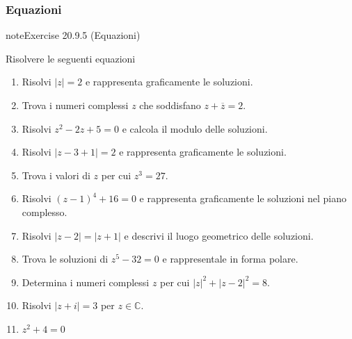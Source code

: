 \documentclass[letterpaper,10pt,italian]{jupyterBook}
\begin{document}
\subsubsection{Equazioni}
\label{\detokenize{ch/algebra/complex-algebra-problems:equazioni}}\label{\detokenize{ch/algebra/complex-algebra-problems:math-hs-algebra-complex-problems-equations-eq}} \label{exercise:ch/algebra/complex-algebra-problems-exercise-4}

\begin{sphinxadmonition}{note}{Exercise 20.9.5 (Equazioni)}



\sphinxAtStartPar
Risolvere le seguenti equazioni
\begin{enumerate}
%
\item {} 
\sphinxAtStartPar
Risolvi \(|z| = 2\) e rappresenta graficamente le soluzioni.

\item {} 
\sphinxAtStartPar
Trova i numeri complessi \(z\) che soddisfano \(z + \overline{z} = 2\).

\item {} 
\sphinxAtStartPar
Risolvi \(z^2 - 2z + 5 = 0\) e calcola il modulo delle soluzioni.

\item {} 
\sphinxAtStartPar
Risolvi \(|z - 3 + 1| = 2\) e rappresenta graficamente le soluzioni.

\item {} 
\sphinxAtStartPar
Trova i valori di \(z\) per cui \(z^3 = 27\).

\item {} 
\sphinxAtStartPar
Risolvi \((z-1)^4 + 16 = 0\) e rappresenta graficamente le soluzioni nel piano complesso.

\item {} 
\sphinxAtStartPar
Risolvi \(|z - 2| = |z + 1|\) e descrivi il luogo geometrico delle soluzioni.

\item {} 
\sphinxAtStartPar
Trova le soluzioni di \(z^5 - 32 = 0\) e rappresentale in forma polare.

\item {} 
\sphinxAtStartPar
Determina i numeri complessi \(z\) per cui \(|z|^2 + |z - 2|^2 = 8\).

\item {} 
\sphinxAtStartPar
Risolvi \(|z + i| = 3\) per \(z \in \mathbb{C}\).

\item {} 
\sphinxAtStartPar
\(z^2 + 4 = 0\)


\end{enumerate}
\end{sphinxadmonition}
\end{document}

